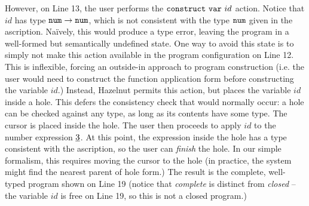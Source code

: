 However, on Line 13, the user performs the $\mathtt{construct}~\mathtt{var}~id$ action. Notice that $id$ has type $\texttt{num} \rightarrow \texttt{num}$, which is not consistent with the type $\texttt{num}$ given in the ascription. Na\"ively, this would produce a type error, leaving the program in a well-formed but semantically undefined state. One way to avoid this state is to simply not make this action available in the program configuration on Line 12. This is inflexible, forcing an outside-in approach to program construction (i.e. the user would need to construct the function application form before constructing the variable $id$.) Instead, Hazelnut permits this action, but places the variable $id$ inside a hole. This defers the consistency check that would normally occur: a hole can be checked against any type, as long as its contents have some type. The cursor is placed inside the hole. The user then proceeds to apply $id$ to the number expression $\underline{3}$. At this point, the expression inside the hole has a type consistent with the ascription, so the user can \emph{finish} the hole. In our simple formalism, this requires moving the cursor to the hole (in practice, the system might find the nearest parent of hole form.) The result is the complete, well-typed program shown on Line 19 (notice that \emph{complete} is distinct from \emph{closed} -- the variable $id$ is free on Line 19, so this is not a closed program.)



